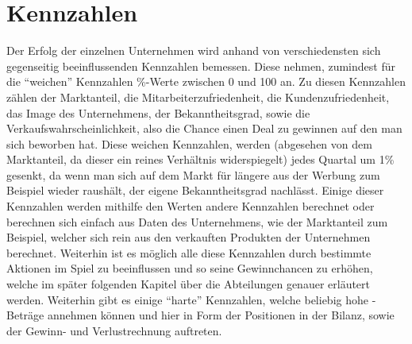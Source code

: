 \section{Kennzahlen}
Der Erfolg der einzelnen Unternehmen wird anhand von verschiedensten sich gegenseitig beeinflussenden Kennzahlen bemessen. Diese nehmen, zumindest für die \enquote{weichen} Kennzahlen \%-Werte zwischen 0 und 100 an. Zu diesen Kennzahlen zählen der Marktanteil, die Mitarbeiterzufriedenheit, die Kundenzufriedenheit, das Image des Unternehmens, der Bekanntheitsgrad, sowie die Verkaufswahrscheinlichkeit, also die Chance einen Deal zu gewinnen auf den man sich beworben hat. Diese weichen Kennzahlen, werden (abgesehen von dem Marktanteil, da dieser ein reines Verhältnis widerspiegelt) jedes Quartal um 1\% gesenkt, da wenn man sich auf dem Markt für längere aus der Werbung zum Beispiel wieder raushält, der eigene Bekanntheitsgrad nachlässt. Einige dieser Kennzahlen werden mithilfe den Werten andere Kennzahlen berechnet oder berechnen sich einfach aus Daten des Unternehmens, wie der Marktanteil zum Beispiel, welcher sich rein aus den verkauften Produkten der Unternehmen berechnet. Weiterhin ist es möglich alle diese Kennzahlen durch bestimmte Aktionen im Spiel zu beeinflussen und so seine Gewinnchancen zu erhöhen, welche im später folgenden Kapitel über die Abteilungen genauer erläutert werden. Weiterhin gibt es einige \enquote{harte} Kennzahlen, welche beliebig hohe \€-Beträge annehmen können und hier in Form der Positionen in der Bilanz, sowie der Gewinn- und Verlustrechnung auftreten.

